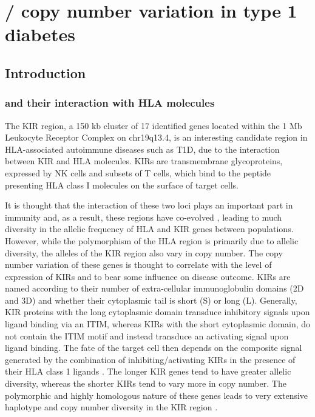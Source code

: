 %

\chapter[KIR3DL1/KIR3DS1 copy number variation in type 1 diabetes]{ \label{chapter:kir} \protect{}/\protect{} copy number variation in type 1 diabetes }

\section{Introduction}

\subsection{ and their interaction with \acrlong{HLA} molecules}

The \gls{KIR} region, a 150 kb cluster of 17 identified genes located within the 1 Mb Leukocyte Receptor Complex on chr19q13.4,
is an interesting candidate region in HLA-associated autoimmune diseases such as \gls{T1D}, due to the interaction between \gls{KIR} and \gls{HLA} molecules.
\Glspl{KIR} are transmembrane glycoproteins, expressed by \gls{NK} cells and subsets of T cells,
which bind to the peptide presenting HLA class I molecules on the surface of target cells.

It is thought that the interaction of these two loci plays an important part in immunity and, as a result, these regions have co-evolved \citep{Parham:2013eb},
leading to much diversity in the allelic frequency of HLA and KIR genes between populations.
However, while the polymorphism of the HLA region is primarily due to allelic diversity, 
the alleles of the \gls{KIR} region also vary in copy number.
The copy number variation of these genes is thought to correlate with the level of expression of \glspl{KIR} and to bear some influence on disease outcome.
\Glspl{KIR} are named according to their number of extra-cellular immunoglobulin domains (2D and 3D) and whether their cytoplasmic tail is short (S) or long (L).  
Generally, KIR proteins with the long cytoplasmic domain transduce inhibitory signals upon ligand binding via an \gls{ITIM},
whereas KIRs with the short cytoplasmic domain, do not contain the \gls{ITIM} motif and instead transduce an activating signal upon ligand binding.  
The fate of the target cell then depends on the composite signal generated by the combination of inhibiting/activating KIRs in the presence of their HLA class 1 ligands \citep{Bashirova:2006dj}.
The longer KIR genes tend to have greater allelic diversity, whereas the shorter KIRs tend to vary more in copy number.
The polymorphic and highly homologous nature of these genes leads to very extensive haplotype and copy number diversity in the KIR region \citep{Jiang:2012cf}.


